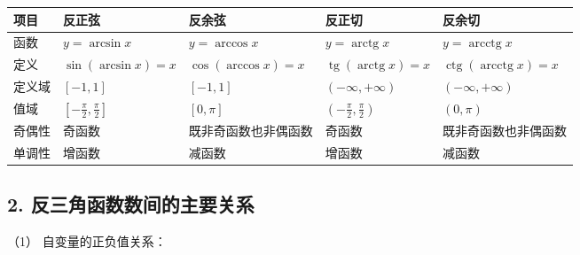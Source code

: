 {\def\LTcaptype{none}%
\footnotesize\setlength{\tabcolsep}{3pt}%
\begin{longtable}[]{@{}
  >{\raggedright\arraybackslash}p{}
  >{\raggedright\arraybackslash}p{}
  >{\raggedright\arraybackslash}p{}
  >{\raggedright\arraybackslash}p{}
  >{\raggedright\arraybackslash}p{}@{}}
\toprule\noalign{}
\begin{minipage}[b]{\linewidth}\raggedright
项目
\end{minipage} & \begin{minipage}[b]{\linewidth}\raggedright
反正弦
\end{minipage} & \begin{minipage}[b]{\linewidth}\raggedright
反余弦
\end{minipage} & \begin{minipage}[b]{\linewidth}\raggedright
反正切
\end{minipage} & \begin{minipage}[b]{\linewidth}\raggedright
反余切
\end{minipage} \\
\midrule\noalign{}
\endhead
\bottomrule\noalign{}
\endlastfoot
函数 & \(y=\arcsin x\) & \(y=\arccos x\) & \(y=\operatorname{arctg}x\) &
\(y=\operatorname{arcctg}x\) \\
定义 & \(\sin(\arcsin x)=x\) & \(\cos(\arccos x)=x\) &
\(\operatorname{tg}(\operatorname{arctg}x)=x\) &
\(\operatorname{ctg}(\operatorname{arcctg}x)=x\) \\
定义域 & \([-1,1]\) & \([-1,1]\) & \(( -\infty,+\infty)\) &
\(( -\infty,+\infty)\) \\
值域 & \(\left[-\frac\pi2,\frac\pi2\right]\) & \([0,\pi]\) &
\(\left(-\frac\pi2,\frac\pi2\right)\) & \((0,\pi)\) \\
奇偶性 & 奇函数 & 既非奇函数也非偶函数 & 奇函数 &
既非奇函数也非偶函数 \\
单调性 & 增函数 & 减函数 & 增函数 & 减函数 \\
\end{longtable}
}

\subsection{2. 反三角函数数间的主要关系}

（1） 自变量的正负值关系：


